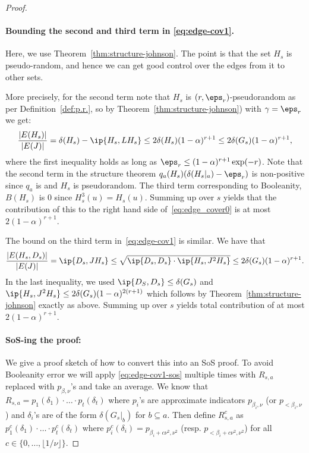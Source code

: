 \begin{proof}
\paragraph{Bounding the second and third term in \eqref{eq:edge-cov1}.} 
Here, we use Theorem~\ref{thm:structure-johnson}. 
The point is that the set $H_s$ is pseudo-random, 
and hence we can get good control over the edges from it to other sets. 

More precisely, for the second term note that $H_s$ is  $(r,\eps_r)$-pseudorandom  as per Definition~\ref{def:p.r.}, 
so by Theorem~\ref{thm:structure-johnson}) with $\gamma =\eps_r$ we get: 
\begin{equation}\label{eq:third-term-ec}
\frac{|E(H_s)|}{|E(J)|} = \delta(H_s) - \ip{H_s, LH_s} \leq 2\delta(H_s)(1-\alpha)^{r+1} \leq 2\delta(G_s)(1-\alpha)^{r+1},
\end{equation}
where the first inequality holds as long as $\eps_r \leq (1-\alpha)^{r+1}\exp(-r)$. Note that the second term in the structure theorem $q_a(H_s)(\delta(H_s|_a) - \eps_r)$ is non-positive since $q_a$ is \sos and $H_s$ is pseudorandom. The third term corresponding to Booleanity, $B(H_s)$ is $0$ since $H_s^3(u) = H_s(u)$.
Summing up over $s$ yields that the contribution of this to the right hand side of~\eqref{eq:edge_cover0} 
is at most $2(1-\alpha)^{r+1}$.

The bound on the third term in~\eqref{eq:edge-cov1} is similar. We have that
\begin{equation}\label{eq:fourth-term-ec}
\frac{|E(H_s,D_s)|}{|E(J)|} = \ip{D_s, J H_s} \leq \sqrt{\ip{D_s,D_s} \cdot \ip{H_s, J^2 H_s}} \leq 2\delta(G_s)(1-\alpha)^{r+1}.
\end{equation}
In the last inequality, we used $\ip{D_S,D_s}\leq \delta(G_s)$ and 
$\ip{H_s, J^2 H_s}\leq 2\delta(G_s)(1-\alpha)^{2(r+1)}$ 
which follows by Theorem~\ref{thm:structure-johnson} 
exactly as above. Summing up over $s$ yields total contribution of at most $2(1-\alpha)^{r+1}$.


\paragraph{SoS-ing the proof:} We give a proof sketch of how to convert this into an SoS proof. To avoid Booleanity error we will apply \eqref{eq:edge-cov1-sos} multiple times with $R_{s,a}$ replaced with $p_{\beta,\nu}$'s and take an average. We know that $R_{s,a} = p_1(\delta_1) \cdot \ldots\cdot p_t(\delta_t)$ where $p_i$'s are approximate indicators $p_{\beta_i,\nu}$ (or $p_{<\beta_i,\nu}$) and $\delta_i$'s are of the form $\delta(G_s|_b)$ for $b \subseteq a$. Then define $R^c_{s,a}$ as $p^c_1(\delta_1) \cdot \ldots\cdot p^c_t(\delta_t)$ where $p^c_i(\delta_i) = p_{\beta_i+c\nu^2,\nu^2}$ (resp. $p_{<\beta_i+c\nu^2,\nu^2}$) for all $c \in \{0,\ldots,\lfloor 1/\nu \rfloor\}$.


\end{proof}
